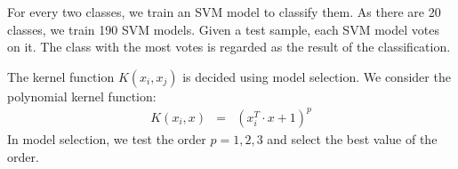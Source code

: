 For every two classes, we train an SVM model to classify them.
As there are 20 classes, we train 190 SVM models.
Given a test sample, each SVM model votes on it.
The class with the most votes is regarded as the result of the classification.

The kernel function $K\left(x_i, x_j\right)$ is decided using model selection.
We consider the polynomial kernel function:
\begin{eqnarray}
    K\left(x_i, x\right) & = & \left(x_i^T\cdot x +1\right)^p
    \label{eqn:svm-kernel}
\end{eqnarray}
In model selection, we test the order $p=1,2,3$ and select the best value of the order.